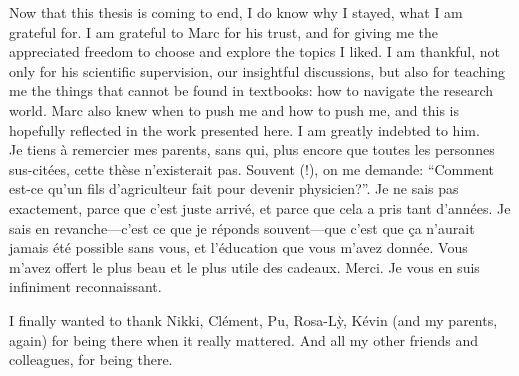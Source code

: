 Now that this thesis is coming to end, I do know why I stayed, what I am
grateful for. I am grateful to Marc for his trust, and for giving me the
appreciated freedom to choose and explore the topics I liked. I am thankful, not
only for his scientific supervision, our insightful discussions, but also for
teaching me the things that cannot be found in textbooks: how to navigate the
research world. Marc also knew when to push me and how to push me, and this is
hopefully reflected in the work presented here. I am greatly indebted to him.\\


Je tiens \`{a} remercier mes parents, sans qui, plus encore que toutes les
personnes sus-cit\'ees, cette th\`ese n'existerait pas.  Souvent (!), on me
demande: ``Comment est-ce qu'un fils d'agriculteur fait pour devenir
physicien?''.  Je ne sais pas exactement, parce que c'est juste arriv\'e, et
parce que cela a pris tant d'ann\'ees. Je sais en revanche---c'est ce que je
r\'eponds souvent---que c'est que \c{c}a n'aurait jamais \'et\'e possible sans
vous, et l'\'education que vous m'avez donn\'ee. Vous m'avez offert le plus
beau et le plus utile des cadeaux. Merci. Je vous en suis infiniment
reconnaissant.

I finally wanted to thank Nikki, Cl\'ement, Pu, Rosa-L\`y, K\'evin (and my
parents, again) for being there when it really mattered. And all my other
friends and colleagues, for being there.\\
\endgroup
